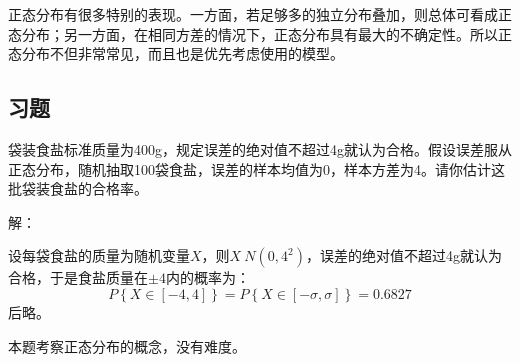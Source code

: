\begin{tcolorbox}
正态分布有很多特别的表现。一方面，若足够多的独立分布叠加，则总体可看成正态分布；另一方面，在相同方差的情况下，正态分布具有最大的不确定性。所以正态分布不但非常常见，而且也是优先考虑使用的模型。
\end{tcolorbox}

\subsection{习题}

\begin{example}
袋装食盐标准质量为400g，规定误差的绝对值不超过4g就认为合格。假设误差服从正态分布，随机抽取100袋食盐，误差的样本均值为0，样本方差为4。请你估计这批袋装食盐的合格率。
\end{example}

解：

设每袋食盐的质量为随机变量$X$，则$X~N\left( 0,4^2 \right) $，误差的绝对值不超过4g就认为合格，于是食盐质量在$\pm 4$内的概率为：
\[
P\left\{ X\in \left[ -4,4 \right] \right\} =P\left\{ X\in \left[ -\sigma ,\sigma \right] \right\} =0.6827
\]
后略。

\begin{tcolorbox}
本题考察正态分布的概念，没有难度。
\end{tcolorbox}




